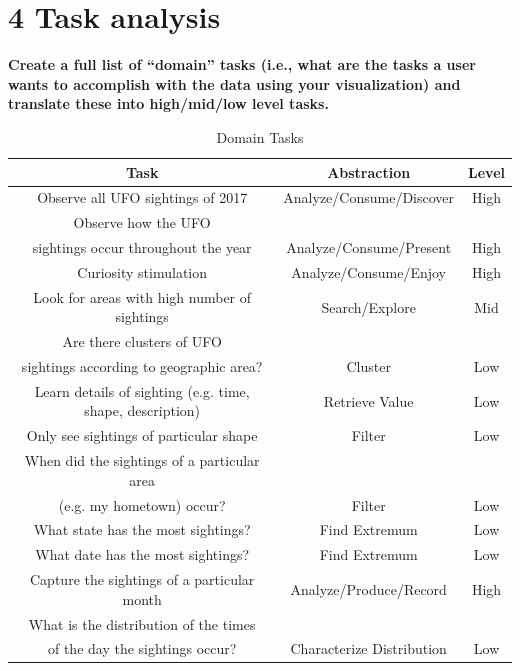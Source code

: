 \documentclass{neu_handout}
\begin{document}
\section*{4 Task analysis}

\textbf{Create a full list of “domain” tasks (i.e., what are the tasks a
user wants to accomplish with the data using your visualization) and translate these into high/mid/low level tasks.}

\begin{table}[h]
\caption{Domain Tasks} %
\centering %
\begin{tabular}{c c c} %
\hline\hline %
 Task & Abstraction & Level \\ [0.5ex]
\hline %
Observe all UFO sightings of 2017 & 
Analyze/Consume/Discover & High \\[1ex] %

Observe how the UFO \\sightings occur throughout the year &
Analyze/Consume/Present &
High \\[1ex] %

Curiosity stimulation &
Analyze/Consume/Enjoy &
High \\[1ex] %

Look for areas with high number of sightings &
Search/Explore &
Mid \\[1ex] %


Are there clusters of UFO\\ sightings according to geographic area? &
Cluster &
Low  \\[1ex] %

Learn details of sighting (e.g. time, shape, description) &
Retrieve Value &
Low \\[1ex] %

Only see sightings of particular shape &
Filter &
Low \\[1ex] %

When did the sightings of a particular area \\(e.g. my hometown) occur? &
Filter &
Low \\[1ex] %

What state has the most sightings? &
Find Extremum &
Low \\[1ex] %

What date has the most sightings? &
Find Extremum &
Low \\[1ex] %

Capture the sightings of a particular month &
Analyze/Produce/Record &
High \\[1ex] %

What is the distribution of the times\\ of the day the sightings occur? &
Characterize Distribution &
Low \\


\hline 
\end{tabular}
\label{tab:PPer}
\end{table}
\end{document}
